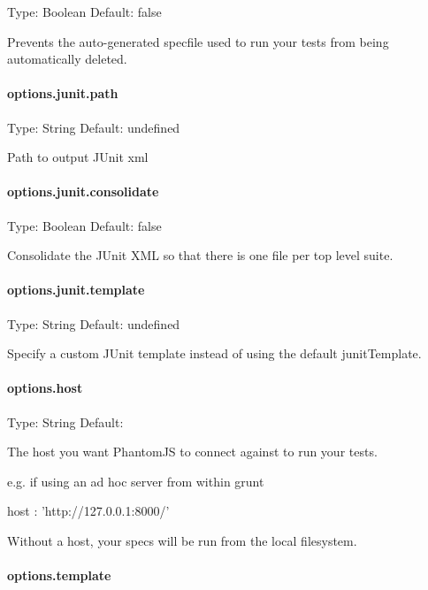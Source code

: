 Type\+: {\ttfamily Boolean} Default\+: {\ttfamily false}

Prevents the auto-\/generated specfile used to run your tests from being automatically deleted.

\paragraph*{options.\+junit.\+path}

Type\+: {\ttfamily String} Default\+: undefined

Path to output J\+Unit xml

\paragraph*{options.\+junit.\+consolidate}

Type\+: {\ttfamily Boolean} Default\+: {\ttfamily false}

Consolidate the J\+Unit X\+M\+L so that there is one file per top level suite.

\paragraph*{options.\+junit.\+template}

Type\+: {\ttfamily String} Default\+: undefined

Specify a custom J\+Unit template instead of using the default {\ttfamily junit\+Template}.

\paragraph*{options.\+host}

Type\+: {\ttfamily String} Default\+: \textquotesingle{}\textquotesingle{}

The host you want Phantom\+J\+S to connect against to run your tests.

e.\+g. if using an ad hoc server from within grunt


\begin{DoxyCode}
host : \textcolor{stringliteral}{'http://127.0.0.1:8000/'}
\end{DoxyCode}


Without a {\ttfamily host}, your specs will be run from the local filesystem.

\paragraph*{options.\+template}

